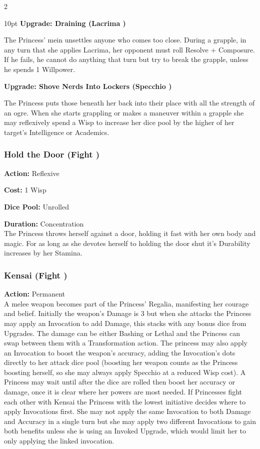 \begin{multicols}{2}
\begin{myindentpar}{10pt}
\textbf{Upgrade: Draining (Lacrima \textbullet\textbullet)}

The Princess' mein unsettles anyone who comes too close. During a grapple, in any turn that she applies Lacrima, her opponent must roll Resolve + Composure. If he fails, he cannot do anything that turn but try to break the grapple, unless he spends 1 Willpower.

\textbf{Upgrade: Shove Nerds Into Lockers  (Specchio \textbullet\textbullet)}

The Princess puts those beneath her back into their place with all the strength of an ogre. When she starts grappling or makes a maneuver within a grapple she may reflexively spend a Wisp to increase her dice pool by the higher of her target's Intelligence or Academics.\end{myindentpar}

\subsubsection*{Hold the Door (Fight \textbullet)}

\noindent \textbf{Action:} Reflexive

\noindent \textbf{Cost:} 1 Wisp

\noindent \textbf{Dice Pool:} Unrolled

\noindent \textbf{Duration:} Concentration\\

The Princess throws herself against a door, holding it fast with her own body and magic. For as long as she devotes herself to holding the door shut it's Durability increases by her Stamina. 

\subsubsection*{Kensai (Fight \textbullet)}

\noindent \textbf{Action:} Permanent \\

\noindent A melee weapon becomes part of the Princess’ Regalia, manifesting her courage and belief. Initially the weapon's Damage is 3 but when she attacks the Princess may apply an Invocation to add Damage, this stacks with any bonus dice from Upgrades. The damage can be either Bashing or Lethal and the Princess can swap between them with a Transformation action. The princess may also apply an Invocation to boost the weapon's accuracy, adding the Invocation's dots directly to her attack dice pool (boosting her weapon counts as the Princess boosting herself, so she may always apply Specchio at a reduced Wisp cost). A Princess may wait until after the dice are rolled then boost her accuracy or damage, once it is clear where her powers are most needed. If Princesses fight each other with Kensai the Princess with the lowest initiative decides where to apply Invocations first. She may not apply the same Invocation to both Damage and Accuracy in a single turn but she may apply two different Invocations to gain both benefits unless she is using an Invoked Upgrade, which would limit her to only applying the linked invocation. 


\end{multicols}
